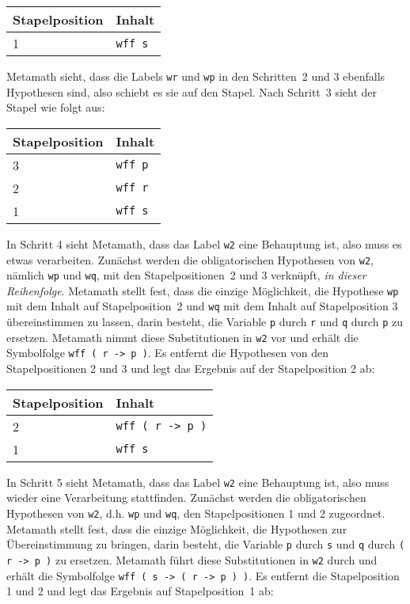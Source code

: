 \begin{center}\begin{tabular}{|l|l|}\hline
{Stapelposition} & {Inhalt} \\ \hline \hline
1 & \texttt{wff s} \\ \hline
\end{tabular}\end{center}

Metamath sieht, dass die Labels \texttt{wr} und \texttt{wp} in den Schritten~2 und 3 ebenfalls Hypothesen sind, also schiebt es sie auf den Stapel.  Nach Schritt~3 sieht der Stapel wie folgt aus:

\begin{center}\begin{tabular}{|l|l|}\hline
{Stapelposition} & {Inhalt} \\ \hline \hline
3 & \texttt{wff p} \\ \hline
2 & \texttt{wff r} \\ \hline
1 & \texttt{wff s} \\ \hline
\end{tabular}\end{center}

In Schritt 4 sieht Metamath, dass das Label \texttt{w2} eine Behauptung ist, also muss es etwas verarbeiten.  Zunächst werden die obligatorischen Hypothesen von \texttt{w2}, nämlich \texttt{wp} und \texttt{wq}, mit den Stapelpositionen~2 und 3 verknüpft, {\em in dieser Reihenfolge}. Metamath stellt fest, dass die einzige Möglichkeit, die Hypothese \texttt{wp} mit dem Inhalt auf Stapelposition~2 und \texttt{wq} mit dem Inhalt auf Stapelposition 3 übereinstimmen zu lassen, darin besteht, die Variable \texttt{p} durch \texttt{r} und \texttt{q} durch \texttt{p} zu ersetzen.  Metamath nimmt diese Substitutionen in \texttt{w2} vor und erhält die Symbolfolge \texttt{wff ( r -> p )}.  Es entfernt die Hypothesen von den Stapelpositionen 2 und 3 und legt das Ergebnis auf der Stapelposition 2 ab:

\begin{center}\begin{tabular}{|l|l|}\hline
{Stapelposition} & {Inhalt} \\ \hline \hline
2 & \texttt{wff ( r -> p )} \\ \hline
1 & \texttt{wff s} \\ \hline
\end{tabular}\end{center}

In Schritt 5 sieht Metamath, dass das Label \texttt{w2} eine Behauptung ist, also muss wieder eine Verarbeitung stattfinden.  Zunächst werden die obligatorischen Hypothesen von \texttt{w2}, d.h. \texttt{wp} und \texttt{wq}, den Stapelpositionen 1 und 2 zugeordnet. Metamath stellt fest, dass die einzige Möglichkeit, die Hypothesen zur Übereinstimmung zu bringen, darin besteht, die Variable \texttt{p} durch \texttt{s} und \texttt{q} durch \texttt{( r -> p )} zu ersetzen.  Metamath führt diese Substitutionen in \texttt{w2} durch und erhält die Symbolfolge \texttt{wff ( s -> ( r -> p ) )}.  Es entfernt die Stapelposition 1 und 2 und legt das Ergebnis auf Stapelposition~1 ab:

